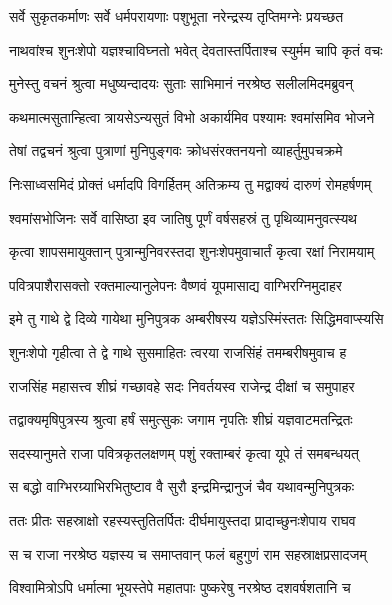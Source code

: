 \twolineshloka
{सर्वे सुकृतकर्माणः सर्वे धर्मपरायणाः}
{पशुभूता नरेन्द्रस्य तृप्तिमग्नेः प्रयच्छत} %

\twolineshloka
{नाथवांश्च शुनःशेपो यज्ञश्चाविघ्नतो भवेत्}
{देवतास्तर्पिताश्च स्युर्मम चापि कृतं वचः} %

\twolineshloka
{मुनेस्तु वचनं श्रुत्वा मधुष्यन्दादयः सुताः}
{साभिमानं नरश्रेष्ठ सलीलमिदमब्रुवन्} %

\twolineshloka
{कथमात्मसुतान्हित्वा त्रायसेऽन्यसुतं विभो}
{अकार्यमिव पश्यामः श्वमांसमिव भोजने} %

\twolineshloka
{तेषां तद्वचनं श्रुत्वा पुत्राणां मुनिपुङ्गवः}
{क्रोधसंरक्तनयनो व्याहर्तुमुपचक्रमे} %

\twolineshloka
{निःसाध्वसमिदं प्रोक्तं धर्मादपि विगर्हितम्}
{अतिक्रम्य तु मद्वाक्यं दारुणं रोमहर्षणम्} %

\twolineshloka
{श्वमांसभोजिनः सर्वे वासिष्ठा इव जातिषु}
{पूर्णं वर्षसहस्रं तु पृथिव्यामनुवत्स्यथ} %

\twolineshloka
{कृत्वा शापसमायुक्तान् पुत्रान्मुनिवरस्तदा}
{शुनःशेपमुवाचार्तं कृत्वा रक्षां निरामयाम्} %

\twolineshloka
{पवित्रपाशैरासक्तो रक्तमाल्यानुलेपनः}
{वैष्णवं यूपमासाद्य वाग्भिरग्निमुदाहर} %

\twolineshloka
{इमे तु गाथे द्वे दिव्ये गायेथा मुनिपुत्रक}
{अम्बरीषस्य यज्ञेऽस्मिंस्ततः सिद्धिमवाप्स्यसि} %

\twolineshloka
{शुनःशेपो गृहीत्वा ते द्वे गाथे सुसमाहितः}
{त्वरया राजसिंहं तमम्बरीषमुवाच ह} %

\twolineshloka
{राजसिंह महासत्त्व शीघ्रं गच्छावहे सदः}
{निवर्तयस्व राजेन्द्र दीक्षां च समुपाहर} %

\twolineshloka
{तद्वाक्यमृषिपुत्रस्य श्रुत्वा हर्षं समुत्सुकः}
{जगाम नृपतिः शीघ्रं यज्ञवाटमतन्द्रितः} %

\twolineshloka
{सदस्यानुमते राजा पवित्रकृतलक्षणम्}
{पशुं रक्ताम्बरं कृत्वा यूपे तं समबन्धयत्} %

\twolineshloka
{स बद्धो वाग्भिरग्र्याभिरभितुष्टाव वै सुरौ}
{इन्द्रमिन्द्रानुजं चैव यथावन्मुनिपुत्रकः} %

\twolineshloka
{ततः प्रीतः सहस्राक्षो रहस्यस्तुतितर्पितः}
{दीर्घमायुस्तदा प्रादाच्छुनःशेपाय राघव} %

\twolineshloka
{स च राजा नरश्रेष्ठ यज्ञस्य च समाप्तवान्}
{फलं बहुगुणं राम सहस्राक्षप्रसादजम्} %

\twolineshloka
{विश्वामित्रोऽपि धर्मात्मा भूयस्तेपे महातपाः}
{पुष्करेषु नरश्रेष्ठ दशवर्षशतानि च} %



